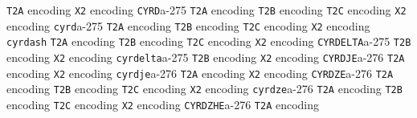 \documentclass[twoside]{ltxdoc}
\makeatletter
\renewenvironment{theindex}{%
   \@restonecoltrue
   \if@twocolumn\@restonecolfalse\fi
   \columnseprule \z@
   \columnsep 35\p@
   \twocolumn[\index@prologue]%
   \IndexParms
   \let\item\@idxitem
   \ignorespaces
}{\if@restonecol\onecolumn\else\clearpage\fi}
\makeatother
\begin{document}
\begin{theindex}
    \subitem \texttt  {T2A} encoding\pfill {}
    \subitem \texttt  {X2} encoding\pfill {}
  \item \texttt  {CYRD}\pfill a-275
    \subitem \texttt  {T2A} encoding\pfill {}
    \subitem \texttt  {T2B} encoding\pfill {}
    \subitem \texttt  {T2C} encoding\pfill {}
    \subitem \texttt  {X2} encoding\pfill {}
  \item \texttt  {cyrd}\pfill a-275
    \subitem \texttt  {T2A} encoding\pfill {}
    \subitem \texttt  {T2B} encoding\pfill {}
    \subitem \texttt  {T2C} encoding\pfill {}
    \subitem \texttt  {X2} encoding\pfill {}
  \item \texttt  {cyrdash}\efill 
    \subitem \texttt  {T2A} encoding\pfill {}
    \subitem \texttt  {T2B} encoding\pfill {}
    \subitem \texttt  {T2C} encoding\pfill {}
    \subitem \texttt  {X2} encoding\pfill {}
  \item \texttt  {CYRDELTA}\pfill a-275
    \subitem \texttt  {T2B} encoding\pfill {}
    \subitem \texttt  {X2} encoding\pfill {}
  \item \texttt  {cyrdelta}\pfill a-275
    \subitem \texttt  {T2B} encoding\pfill {}
    \subitem \texttt  {X2} encoding\pfill {}
  \item \texttt  {CYRDJE}\pfill a-276
    \subitem \texttt  {T2A} encoding\pfill {}
    \subitem \texttt  {X2} encoding\pfill {}
  \item \texttt  {cyrdje}\pfill a-276
    \subitem \texttt  {T2A} encoding\pfill {}
    \subitem \texttt  {X2} encoding\pfill {}
  \item \texttt  {CYRDZE}\pfill a-276
    \subitem \texttt  {T2A} encoding\pfill {}
    \subitem \texttt  {T2B} encoding\pfill {}
    \subitem \texttt  {T2C} encoding\pfill {}
    \subitem \texttt  {X2} encoding\pfill {}
  \item \texttt  {cyrdze}\pfill a-276
    \subitem \texttt  {T2A} encoding\pfill {}
    \subitem \texttt  {T2B} encoding\pfill {}
    \subitem \texttt  {T2C} encoding\pfill {}
    \subitem \texttt  {X2} encoding\pfill {}
  \item \texttt  {CYRDZHE}\pfill a-276
    \subitem \texttt  {T2A} encoding\pfill {}

\end{theindex}
\end{document}
